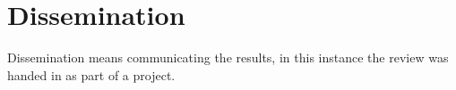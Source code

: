 \documentclass[a4paper]{book}
\begin{document}
\section{Dissemination}
Dissemination means communicating the results, in this instance the review was handed in as part
of a project.






\end{document}
